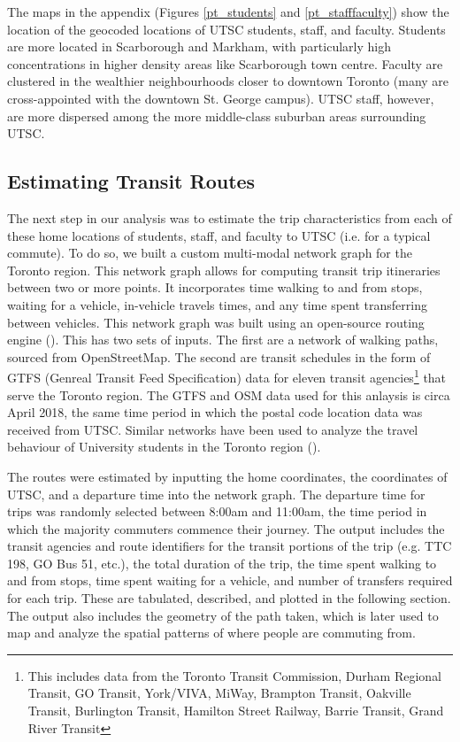 \documentclass{article}
\begin{document}
		The maps in the appendix (Figures \ref{pt_students} and \ref{pt_stafffaculty}) show the location of the geocoded locations of UTSC students, staff, and faculty. Students are more located in Scarborough and Markham, with particularly high concentrations in higher density areas like Scarborough town centre. Faculty are clustered in the wealthier neighbourhoods closer to downtown Toronto (many are cross-appointed with the downtown St. George campus). UTSC staff, however, are more dispersed among the more middle-class suburban areas surrounding UTSC.

	
	\subsection{Estimating Transit Routes}

		The next step in our analysis was to estimate the trip characteristics from each of these home locations of students, staff, and faculty to UTSC (i.e. for a typical commute). To do so, we built a custom multi-modal network graph for the Toronto region. This network graph allows for computing transit trip itineraries between two or more points. It incorporates time walking to and from stops, waiting for a vehicle, in-vehicle travels times, and any time spent transferring between vehicles. This network graph was built using an open-source routing engine (\cite{otp}). This has two sets of inputs. The first are a network of walking paths, sourced from OpenStreetMap. The second are transit schedules in the form of GTFS (Genreal Transit Feed Specification) data for eleven transit agencies\footnote{This includes data from the Toronto Transit Commission, Durham Regional Transit, GO Transit, York/VIVA, MiWay, Brampton Transit, Oakville Transit, Burlington Transit, Hamilton Street Railway, Barrie Transit, Grand River Transit} that serve the Toronto region. The GTFS and OSM data used for this anlaysis is circa April 2018, the same time period in which the postal code location data was received from UTSC. Similar networks have been used to analyze the travel behaviour of University students in the Toronto region (\cite{allen2018}).

		The routes were estimated by inputting the home coordinates, the coordinates of UTSC, and a departure time into the network graph. The departure time for trips was randomly selected between 8:00am and 11:00am, the time period in which the majority commuters commence their journey. The output includes the transit agencies and route identifiers for the transit portions of the trip (e.g. TTC 198, GO Bus 51, etc.), the total duration of the trip, the time spent walking to and from stops, time spent waiting for a vehicle, and number of transfers required for each trip. These are tabulated, described, and plotted in the following section. The output also includes the geometry of the path taken, which is later used to map and analyze the spatial patterns of where people are commuting from.
\end{document}

